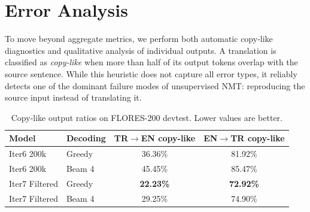 \documentclass[runningheads]{llncs}
\begin{document}
\section{Error Analysis}
\label{sec:error}

To move beyond aggregate metrics, we perform both automatic copy-like diagnostics and qualitative analysis of individual outputs. A translation is classified as \emph{copy-like} when more than half of its output tokens overlap with the source sentence. While this heuristic does not capture all error types, it reliably detects one of the dominant failure modes of unsupervised NMT: reproducing the source input instead of translating it.

\begin{table}[t]
\centering
\caption{Copy-like output ratios on FLORES-200 devtest. Lower values are better.}
\begin{tabular}{@{}llcc@{}}
\toprule
\textbf{Model} & \textbf{Decoding} & \textbf{TR$\rightarrow$EN copy-like} & \textbf{EN$\rightarrow$TR copy-like} \\
\midrule
Iter6 200k & Greedy & 36.36\% & 81.92\% \\
Iter6 200k & Beam 4 & 45.45\% & 85.47\% \\
Iter7 Filtered & Greedy & \textbf{22.23\%} & \textbf{72.92\%} \\
Iter7 Filtered & Beam 4 & 29.25\% & 74.90\% \\
\bottomrule
\end{tabular}
\label{tab:copy-diagnostics}
\end{table}
\end{document}
